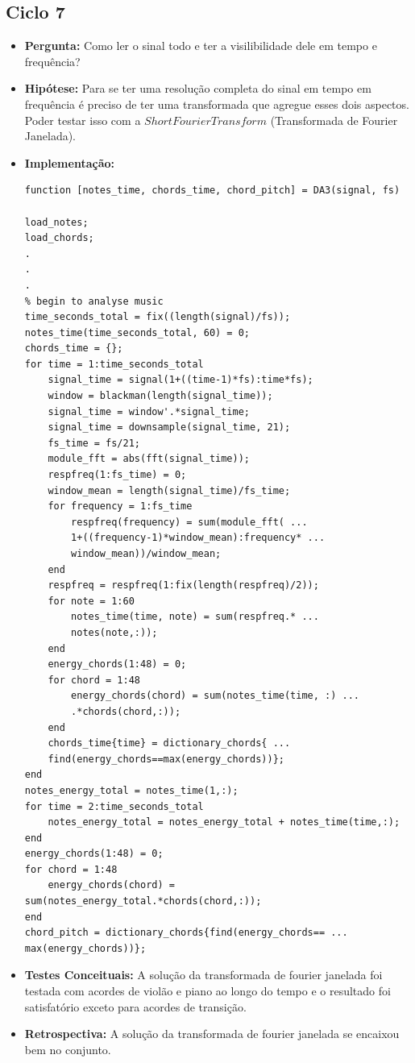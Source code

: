 \subsection{Ciclo 7}
\label{subsec:ciclo_7}
\begin{itemize}
\item \textbf{Pergunta:} Como ler o sinal todo e ter a visilibilidade dele em tempo e frequência?
\item \textbf{Hipótese:} Para se ter uma resolução completa do sinal em tempo em frequência é preciso de ter uma transformada que agregue esses dois aspectos. Poder testar isso com a $Short Fourier Transform$ (Transformada de Fourier Janelada).   
\item \textbf{Implementação:} 
\begin{lstlisting}
function [notes_time, chords_time, chord_pitch] = DA3(signal, fs)

load_notes;
load_chords;
.
.
.
% begin to analyse music
time_seconds_total = fix((length(signal)/fs));
notes_time(time_seconds_total, 60) = 0;
chords_time = {};
for time = 1:time_seconds_total
    signal_time = signal(1+((time-1)*fs):time*fs);
    window = blackman(length(signal_time));
    signal_time = window'.*signal_time;
    signal_time = downsample(signal_time, 21);
    fs_time = fs/21;
    module_fft = abs(fft(signal_time));
    respfreq(1:fs_time) = 0;
    window_mean = length(signal_time)/fs_time;
    for frequency = 1:fs_time
        respfreq(frequency) = sum(module_fft( ...
        1+((frequency-1)*window_mean):frequency* ...
        window_mean))/window_mean;
    end
    respfreq = respfreq(1:fix(length(respfreq)/2));
    for note = 1:60
        notes_time(time, note) = sum(respfreq.* ...
        notes(note,:));    
    end
    energy_chords(1:48) = 0;
    for chord = 1:48
        energy_chords(chord) = sum(notes_time(time, :) ...
        .*chords(chord,:));
    end
    chords_time{time} = dictionary_chords{ ...
    find(energy_chords==max(energy_chords))};
end
notes_energy_total = notes_time(1,:);
for time = 2:time_seconds_total
    notes_energy_total = notes_energy_total + notes_time(time,:);
end
energy_chords(1:48) = 0;
for chord = 1:48
    energy_chords(chord) = sum(notes_energy_total.*chords(chord,:));
end
chord_pitch = dictionary_chords{find(energy_chords== ...
max(energy_chords))};
\end{lstlisting}
\item \textbf{Testes Conceituais:} A solução da transformada de fourier janelada foi testada com acordes de violão e piano ao longo do tempo e o resultado foi satisfatório exceto para acordes de transição.
\item \textbf{Retrospectiva:} A solução da transformada de fourier janelada se encaixou bem no conjunto.  
\end{itemize}

